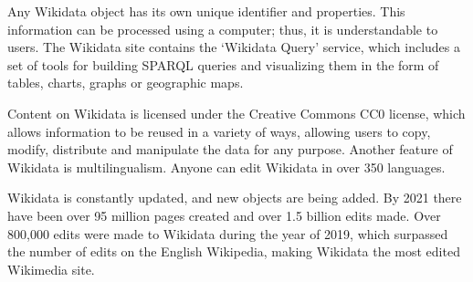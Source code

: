 Any Wikidata object has its own unique identifier and properties. This information can be processed using a computer; thus, it is understandable to users. The Wikidata site contains the ‘Wikidata Query’ service, which includes a set of tools for building SPARQL queries and visualizing them in the form of tables, charts, graphs or geographic maps.

Content on Wikidata is licensed under the Creative Commons CC0 license, which allows information to be reused in a variety of ways, allowing users to copy, modify, distribute and manipulate the data for any purpose. Another feature of Wikidata is multilingualism. Anyone can edit Wikidata in over 350 languages.

Wikidata is constantly updated, and new objects are being added. By 2021 there have been over 95 million pages created and over 1.5 billion edits made. Over 800,000 edits were made to Wikidata during the year of 2019, which surpassed the number of edits on the English Wikipedia, making Wikidata the most edited Wikimedia site.

